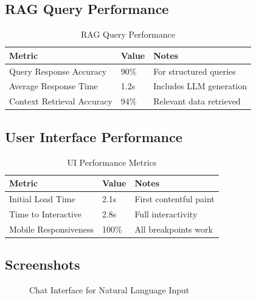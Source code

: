 \subsection{RAG Query Performance}

\begin{table}[H]
\centering
\caption{RAG Query Performance}
\label{tab:rag-performance}
\begin{tabular}{|p{5cm}|p{3cm}|p{4cm}|}
\hline
\textbf{Metric} & \textbf{Value} & \textbf{Notes} \\
\hline
Query Response Accuracy & 90\% & For structured queries \\
\hline
Average Response Time & 1.2s & Includes LLM generation \\
\hline
Context Retrieval Accuracy & 94\% & Relevant data retrieved \\
\hline
\end{tabular}
\end{table}

\subsection{User Interface Performance}

\begin{table}[H]
\centering
\caption{UI Performance Metrics}
\label{tab:ui-performance}
\begin{tabular}{|p{5cm}|p{3cm}|p{4cm}|}
\hline
\textbf{Metric} & \textbf{Value} & \textbf{Notes} \\
\hline
Initial Load Time & 2.1s & First contentful paint \\
\hline
Time to Interactive & 2.8s & Full interactivity \\
\hline
Mobile Responsiveness & 100\% & All breakpoints work \\
\hline
\end{tabular}
\end{table}

\subsection{Screenshots}

\begin{figure}[H]
    \centering
    \caption{Chat Interface for Natural Language Input}
    \label{fig:screenshot-chat}
\end{figure}

